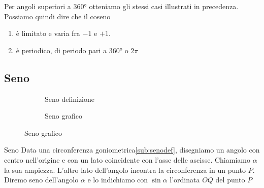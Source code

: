 Per angoli superiori a \ang{360} otteniamo gli stessi casi illustrati in precedenza. 
Possiamo quindi dire che il coseno
\begin{enumerate}
	\item è limitato e varia fra $-1$ e $+1$.
	\item è periodico, di periodo pari a \ang{360} o $2\pi$
	\end{enumerate} 
\begin{figure}
		\centering

		\label{fig:AndamentoCoseno1}
	\end{figure}%
	\begin{figure}
		\centering

		\label{fig:AndamentoCoseno2}
\end{figure}
\subsection{Seno}
\label{sec:senogonio}
\begin{figure}
	\begin{subfigure}[b]{.5\linewidth}
		\centering
			
		\caption{Seno definizione}\label{sub:senodef}
	\end{subfigure}%
	\begin{subfigure}[b]{.5\linewidth}
		\centering
		
		\caption{Seno grafico}\label{sub:senograf}
	\end{subfigure}
	\label{tab:funseno}
\end{figure}
\begin{definizionet}{Seno}{}
	Data una circonferenza goniometrica\nobs\vref{sub:senodef}, disegniamo un angolo con centro nell'origine e con un lato coincidente con l'asse delle ascisse.  Chiamiamo  $\alpha$ la sua ampiezza. L'altro lato dell'angolo incontra la circonferenza in un punto $P$.  Diremo seno dell'angolo $\alpha$ e lo indichiamo con $\sin\alpha$ l'ordinata $OQ$  del punto $P$
\end{definizionet}
